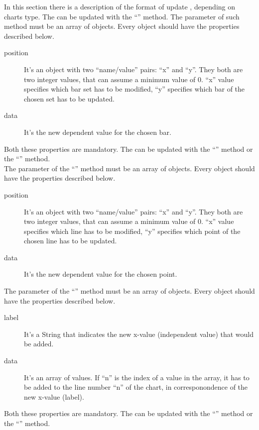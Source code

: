 		In this section there is a description of the format of update , depending on charts type. 
			The  can be updated with the “” method. The parameter of such method must be an array of objects. Every object should have the properties described below.
			\begin{description}
				\item[position] It's an object with two “name/value” pairs: “x” and “y”. They both are two integer values, that can assume a minimum value of 0. “x” value specifies which bar set has to be modified, “y” specifies which bar of the chosen set has to be updated.
				\item[data] It's the new dependent value for the chosen bar.
			\end{description}
			Both these properties are mandatory.
			The  can be updated with the “” method or the “” method.\\
			The parameter of the “” method must be an array of objects. Every object should have the properties described below.
			\begin{description}
				\item[position] It's an object with two “name/value” pairs: “x” and “y”. They both are two integer values, that can assume a minimum value of 0. “x” value specifies which line has to be modified, “y” specifies which point of the chosen line has to be updated.
				\item[data] It's the new dependent value for the chosen point.
			\end{description}
			The parameter of the “” method must be an array of objects. Every object should have the properties described below.
			\begin{description}
				\item[label] It's a String that indicates the new x-value (independent value) that would be added.
				\item[data] It's an array of values. If “n” is the index of a value in the array, it has to be added to the line number “n” of the chart, in corresponondence of the new x-value (label).
			\end{description}
			Both these properties are mandatory.
			The  can be updated with the “” method or the “” method.\\
